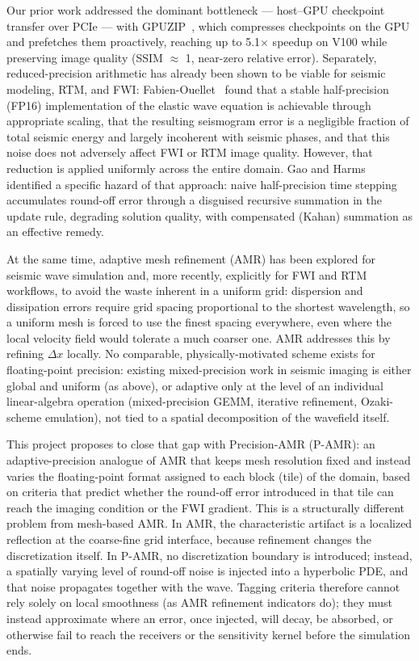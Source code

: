 \documentclass[12pt,a4paper]{article}
\newcommand{\pamr}{P\nobreakdash-AMR}
\begin{document}
Our prior work addressed the dominant bottleneck --- host--GPU checkpoint
transfer over PCIe --- with GPUZIP~\cite{maltempi2025checkpointing,gpuzip}, which
compresses checkpoints on the GPU and prefetches them proactively, reaching up to
5.1$\times$ speedup on V100 while preserving image quality (SSIM $\approx$ 1,
near-zero relative error). Separately, reduced-precision arithmetic has already
been shown to be viable for seismic modeling, RTM, and FWI:
Fabien-Ouellet~\cite{fabienouellet2020half} found that a stable half-precision
(FP16) implementation of the elastic wave equation is achievable through
appropriate scaling, that the resulting seismogram error is a negligible fraction
of total seismic energy and largely incoherent with seismic phases, and that this
noise does not adversely affect FWI or RTM image quality. However, that reduction
is applied uniformly across the entire domain. Gao and
Harms~\cite{gao2023half} identified a specific hazard of that approach: naive
half-precision time stepping accumulates round-off error through a disguised
recursive summation in the update rule, degrading solution quality, with
compensated (Kahan) summation as an effective remedy.

At the same time, adaptive mesh refinement (AMR) has been explored for seismic
wave simulation and, more recently, explicitly for FWI and RTM workflows, to
avoid the waste inherent in a uniform grid: dispersion and dissipation errors
require grid spacing proportional to the shortest wavelength, so a uniform mesh
is forced to use the finest spacing everywhere, even where the local velocity
field would tolerate a much coarser one. AMR addresses this by refining
$\Delta x$ locally. No comparable, physically-motivated scheme exists for
floating-point precision: existing mixed-precision work in seismic imaging is
either global and uniform (as above), or adaptive only at the level of an
individual linear-algebra operation (mixed-precision GEMM, iterative refinement,
Ozaki-scheme emulation), not tied to a spatial decomposition of the wavefield
itself.

This project proposes to close that gap with Precision-AMR (\pamr{}): an
adaptive-precision analogue of AMR that keeps mesh resolution fixed and instead
varies the floating-point format assigned to each block (tile) of the domain,
based on criteria that predict whether the round-off error introduced in that
tile can reach the imaging condition or the FWI gradient. This is a structurally
different problem from mesh-based AMR. In AMR, the characteristic artifact is a
localized reflection at the coarse-fine grid interface, because refinement
changes the discretization itself. In \pamr{}, no discretization boundary is
introduced; instead, a spatially varying level of round-off noise is injected
into a hyperbolic PDE, and that noise propagates together with the wave. Tagging
criteria therefore cannot rely solely on local smoothness (as AMR refinement
indicators do); they must instead approximate where an error, once injected, will
decay, be absorbed, or otherwise fail to reach the receivers or the sensitivity
kernel before the simulation ends.
\end{document}

